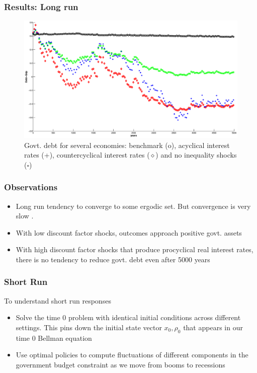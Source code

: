 \documentclass{beamer}
\begin{document}
\begin{frame}
 \frametitle{Results: Long run}

  \begin{figure}[htp]
 \centering
 \includegraphics[width=\textwidth]{Draft25Graphs/LongSimulationsColor.eps}
 \caption{Govt. debt for several economies: benchmark (o), acyclical interest rates (\color{blue}+\color{black}), countercyclical interest rates (\color{red}$\diamond$\color{black}) and no inequality shocks \scriptsize (\color{green}$\square$\color{green}\normalsize) }
 \label{fig:LongSimulations}
 \end{figure}


 \end{frame}

 \begin{frame}[label=main]
  \frametitle{Observations}
  \begin{itemize}
   \item Long run tendency to converge to some ergodic set. But convergence is very slow
   \hyperlink{convergence}{}.
   \item With low discount factor shocks, outcomes approach positive govt. assets
   \item With high discount factor shocks that produce procyclical real interest rates, there is no tendency to reduce govt. debt even after 5000 years
  \end{itemize}

 \end{frame}

 \begin{frame}
  \frametitle{Short Run}
  To understand short run responses
  \begin{itemize}
   \item Solve the time 0 problem with identical initial conditions across
different settings. This pins down the initial state vector  $x_0,\rho_0$  that appears in our time $0$ Bellman equation
\item Use  optimal policies to compute fluctuations of
different components in the government budget constraint as we move from booms to recessions
  \end{itemize}
 \end{frame}
\end{document}
